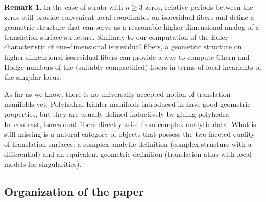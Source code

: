 \documentclass[11pt]{article}
\newcommand{\Subsection}{\subsection}
\theoremstyle{definition}
\newtheorem{rmk}[thm]{Remark}
\begin{document}
\begin{rmk}
In the case of strata with $n \geq 3$ zeros, relative periods between the zeros still provide convenient local coordinates on isoresidual fibers and define a geometric structure that can serve as a reasonable higher-dimensional analog of a translation surface structure. Similarly to our computation of the Euler characteristic of one-dimensional isoresidual fibers, a geometric structure on higher-dimensional isoresidual fibers can provide a way to compute Chern and Hodge numbers of the (suitably compactified) fibers in terms of local invariants of the singular locus.

As far as we know, there is no universally accepted notion of translation manifolds yet. Polyhedral Kähler manifolds introduced in \cite{Pan} have good geometric properties, but they are usually defined inductively by gluing polyhedra. In~contrast, isoresidual fibers directly arise from complex-analytic data. What is still missing is a natural category of objects that possess the two-faceted quality of translation surfaces: a complex-analytic definition (complex structure with a differential) and an equivalent geometric definition (translation atlas with local models for singularities).
\end{rmk}

\Subsection{Organization of the paper}
\end{document}
